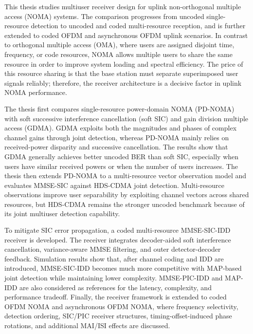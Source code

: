 \begin{abstract*}

This thesis studies multiuser receiver design for uplink non-orthogonal multiple access (NOMA) systems. The comparison progresses from uncoded single-resource detection to uncoded and coded multi-resource reception, and is further extended to coded OFDM and asynchronous OFDM uplink scenarios. In contrast to orthogonal multiple access (OMA), where users are assigned disjoint time, frequency, or code resources, NOMA allows multiple users to share the same resource in order to improve system loading and spectral efficiency. The price of this resource sharing is that the base station must separate superimposed user signals reliably; therefore, the receiver architecture is a decisive factor in uplink NOMA performance.

The thesis first compares single-resource power-domain NOMA (PD-NOMA) with soft successive interference cancellation (soft SIC) and gain division multiple access (GDMA). GDMA exploits both the magnitudes and phases of complex channel gains through joint detection, whereas PD-NOMA mainly relies on received-power disparity and successive cancellation. The results show that GDMA generally achieves better uncoded BER than soft SIC, especially when users have similar received powers or when the number of users increases. The thesis then extends PD-NOMA to a multi-resource vector observation model and evaluates MMSE-SIC against HDS-CDMA joint detection. Multi-resource observations improve user separability by exploiting channel vectors across shared resources, but HDS-CDMA remains the stronger uncoded benchmark because of its joint multiuser detection capability.

To mitigate SIC error propagation, a coded multi-resource MMSE-SIC-IDD receiver is developed. The receiver integrates decoder-aided soft interference cancellation, variance-aware MMSE filtering, and outer detector-decoder feedback. Simulation results show that, after channel coding and IDD are introduced, MMSE-SIC-IDD becomes much more competitive with MAP-based joint detection while maintaining lower complexity. MMSE-PIC-IDD and MAP-IDD are also considered as references for the latency, complexity, and performance tradeoff. Finally, the receiver framework is extended to coded OFDM NOMA and asynchronous OFDM NOMA, where frequency selectivity, detection ordering, SIC/PIC receiver structures, timing-offset-induced phase rotations, and additional MAI/ISI effects are discussed.

\end{abstract*}

